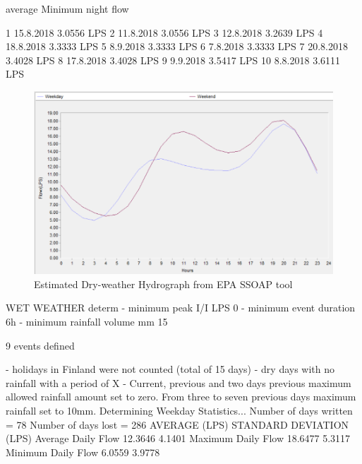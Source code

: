 average Minimum night flow

1   15.8.2018   3.0556 LPS
2   11.8.2018   3.0556 LPS
3   12.8.2018   3.2639 LPS
4   18.8.2018   3.3333 LPS
5   8.9.2018   3.3333 LPS
6   7.8.2018   3.3333 LPS
7   20.8.2018   3.4028 LPS
8   17.8.2018   3.4028 LPS
9   9.9.2018   3.5417 LPS
10   8.8.2018   3.6111 LPS



\begin{figure}[ht]
    \centering
	\includegraphics[scale=0.6]{figures/ssoap_dry_hydrograph.png}
	\caption{Estimated Dry-weather Hydrograph from EPA SSOAP tool}
	\label{fig:ssoapdryh}
\end{figure}
    
    
WET WEATHER determ
- minimum peak I/I LPS 0 
- minimum event duration 6h
- minimum rainfall volume mm 15


9 events defined




- holidays in Finland were not counted (total of 15 days)
- dry days with no rainfall with a period of X
- Current, previous and two days previous maximum allowed rainfall amount set to zero. From three to seven previous days maximum rainfall set to 10mm.
Determining Weekday Statistics...
 Number of days written = 78
 Number of days lost    = 286
                      AVERAGE (LPS)   STANDARD DEVIATION (LPS)
Average Daily Flow      12.3646                  4.1401
Maximum Daily Flow      18.6477                  5.3117
Minimum Daily Flow      6.0559                  3.9778


